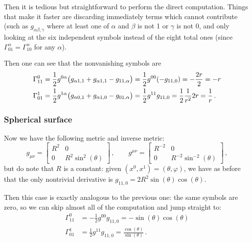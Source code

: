 \documentclass[main.tex]{subfiles}
\begin{document}
Then it is tedious but straightforward to perform the direct computation.
Things that make it faster are discarding immediately terms which cannot contribute (such as \(g_{\alpha \beta ,\gamma }\) where at least one of \(\alpha \) and \(\beta \) is not 1 or \(\gamma \) is not \(0\), and only looking at the six independent symbols instead of the eight total ones (since \(\Gamma^{\alpha }_{01} = \Gamma^{\alpha }_{10}\) for any \(\alpha \)).

Then one can see that the nonvanishing symbols are
%
\begin{subequations}
\begin{align}
  \Gamma^{0}_{11} &= \frac{1}{2} g^{0\alpha}\qty(g_{\alpha 1, 1}  + g_{\alpha 1, 1} - g_{11, \alpha }) 
  = \frac{1}{2} g^{00}(-g_{11, 0}) = - \frac{2r}{2} = -r  \\
  \Gamma^{1}_{01} &= \frac{1}{2} g^{1 \alpha }\qty(g_{\alpha 0, 1} + g_{\alpha 1, 0} - g_{01, \alpha })
  = \frac{1}{2} g^{11} g_{11, 0} = \frac{1}{2} \frac{1}{r^2} 2r = \frac{1}{r}
\,.
\end{align}
\end{subequations}
%

\subsubsection{Spherical surface}

Now we have the following metric and inverse metric: 
%
\begin{equation} \label{eq:spherical-metric} 
  g_{\mu \nu } = \left[\begin{array}{cc}
  R^2 & 0 \\ 
  0 & R^2 \sin^2(\theta ) 
  \end{array}\right]\,,
  \qquad
  g^{\mu \nu } = \left[\begin{array}{cc}
  R^{-2} & 0 \\ 
  0 & R^{-2}\sin^{-2}(\theta ) 
  \end{array}\right]
\,,
\end{equation}
%
but do note that \(R\) is a constant: given \((x^{0}, x^{1}) = (\theta, \varphi)\), we have as before that the only nontrivial derivative is \(g_{11,0} = 2 R^2  \sin(\theta ) \cos(\theta) \).

Then this case is exactly analogous to the previous one: the same symbols are zero, so we can skip almost all of the computation and jump straight to: 
%
\begin{subequations} \label{eq:spherical-christoffel} 
\begin{align}
  \Gamma^{0}_{11} &= -\frac{1}{2} g^{00}g_{11,0} = - \sin(\theta ) \cos(\theta ) \\
  \Gamma^{1}_{01} &= \frac{1}{2} g^{11}g_{11,0} = \frac{\cos(\theta ) } {\sin(\theta ) }
\,.
\end{align}
\end{subequations}
\end{document}
